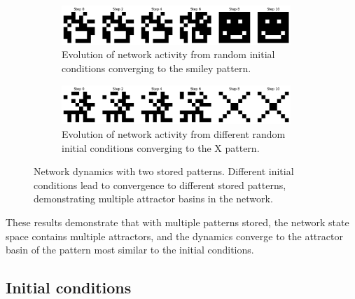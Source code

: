 \documentclass{article}
\begin{document}
\begin{figure}[H]
\centering
\begin{subfigure}[b]{0.95\textwidth}
    \centering
    \includegraphics[width=0.95\textwidth]{Network Converge Smiley.png}
    \caption{Evolution of network activity from random initial conditions converging to the smiley pattern.}
    \label{fig:converge_smiley}
\end{subfigure}

\vspace{0.5cm}
\begin{subfigure}[b]{0.95\textwidth}
    \centering
    \includegraphics[width=0.95\textwidth]{Network Converge X.png}
    \caption{Evolution of network activity from different random initial conditions converging to the X pattern.}
    \label{fig:converge_x}
\end{subfigure}

\caption{Network dynamics with two stored patterns. Different initial conditions lead to convergence to different stored patterns, demonstrating multiple attractor basins in the network.}
\label{fig:dual_convergence}
\end{figure}


These results demonstrate that with multiple patterns stored, the network state space contains multiple attractors, and the dynamics converge to the attractor basin of the pattern most similar to the initial conditions.


\subsection{Initial conditions}
\end{document}
